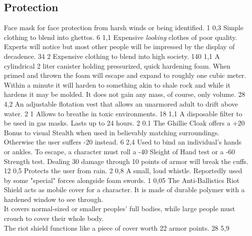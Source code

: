 \subsection{Protection}
\vspace{10mm}
\begin{multicols}{2}
    {Face mask for face protection from harsh winds or being identified.}
    {1}
    {0,3}
    {Simple clothing to blend into ghettos.}
    {6}
    {1,1}
    {Expensive \emph{looking} clothes of poor quality.
        Experts will notice but most other people will be impressed by the display of decadence.}
    {34}
    {2}
    {Expensive clothing to blend into high society.}
    {140}
    {1,1}
    {A cylindrical 2 liter canister holding pressurized, quick hardening foam.
        When primed and thrown the foam will escape and expand to roughly one cubic meter.
        Within a minute it will harden to something akin to shale rock and while it hardens it may be molded.
        It does not gain any mass, of course, only volume.}
    {28}
    {4,2}
    {An adjustable flotation vest that allows an unarmored adult to drift above water.}
    {2}
    {1}
    {Allows to breathe in toxic environments.}
    {18}
    {1,1}
    {A disposable filter to be used in gas masks.
        Lasts up to 24 hours.}
    {2}
    {0.1}
    {The Ghillie Cloak offers a +20 Bonus to visual Stealth when used in believably matching surroundings.
        Otherwise the user suffers -20 instead.}
    {6}
    {2,4}
    {Used to bind an individual’s hands or ankles.
        To escape, a character must roll a -40 Sleight of Hand test or a -60 Strength test.
        Dealing 30 damage through 10 points of armor will break the cuffs.}
    {12}
    {0,5}
    {Protects the user from rain.}
    {2}
    {0,8}
    {A small, loud whistle. Reportedly used by some "special" forces alongside foam swords.}
    {1}
    {0,05}
    {The Anti-Ballistics Riot Shield acts as mobile cover for a character.
        It is made of durable polymer with a hardened window to see through.\\
        It covers normal-sized or smaller peoples' full bodies,
        while large people must crouch to cover their whole body.\\
        The riot shield functions like a piece of cover worth 22 armor points.}
    {28}
    {5,9}
\end{multicols}

